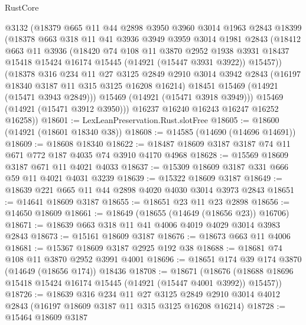 \begin{lexlean}{RustCore}
\begin{coremodule}
        @3132
        (@18379
          @665
          @11
          @44
          @2898
          @3950
          @3960
          @3014
          @1963
          @2843
          @18399
          (@18378
            @663
            @318
            @11
            @41
            @3936
            @3949
            @3959
            @3014
            @1981
            @2843
            (@18412
              @663
              @11
              @3936
              (@18420
                @74
                @108
                @11
                @3870
                @2952
                @1938
                @3931
                @18437
                @15418
                @15424
                @16174
                @15445
                (@14921 (@15447 @3931 @3922))
                @15457))
            (@18378
              @316
              @234
              @11
              @27
              @3125
              @2849
              @2910
              @3014
              @3942
              @2843
              (@16197 @18340 @3187 @11 @315 @3125 @16208 @16214)
              @18451
              @15469
              (@14921 (@15471 @3943 @2849)))
            @15469
            (@14921 (@15471 @3918 @3949)))
          @15469
          (@14921 (@15471 @3912 @3950)))
        @16237
        @16240
        @16243
        @16247
        @16252
        @16258))
@18601 := LexLeanPreservation.Rust.slotFree
@18605 := @18600 (@14921 (@18601 @18340 @38))
@18608 := @14585 (@14690 (@14696 @14691))
@18609 := @18608 @18340
@18622 := @18487 @18609 @3187 @3187 @74 @11 @671 @772 @187 @4035 @74 @3910 @4170 @4968
@18628 := @15569 @18609 @3187 @671 @11 @4021 @4033
@18637 := @15309 @18609 @3187 @331 @666 @59 @11 @4021 @4031 @3239
@18639 := @15322 @18609 @3187
@18649 := @18639 @221 @665 @11 @44 @2898 @4020 @4030 @3014 @3973 @2843
@18651 := @14641 @18609 @3187
@18655 := @18651 @23 @11 @23 @2898
@18656 := @14650 @18609
@18661 := @18649 (@18655 (@14649 (@18656 @23)) @16706)
@18671 := @18639 @663 @318 @11 @41 @4006 @4019 @4029 @3014 @3983 @2843
@18673 := @15161 @18609 @3187
@18676 := @18673 @663 @11 @4006
@18681 := @15367 @18609 @3187 @2925 @192 @38
@18688 := @18681 @74 @108 @11 @3870 @2952 @3991 @4001
@18696 := @18651 @174 @39 @174 @3870 (@14649 (@18656 @174)) @18436
@18708 := @18671
    (@18676 (@18688 @18696 @15418 @15424 @16174 @15445 (@14921 (@15447 @4001 @3992)) @15457))
@18726 := @18639
    @316
    @234
    @11
    @27
    @3125
    @2849
    @2910
    @3014
    @4012
    @2843
    (@16197 @18609 @3187 @11 @315 @3125 @16208 @16214)
@18728 := @15464 @18609 @3187

\end{coremodule}
\end{lexlean}
